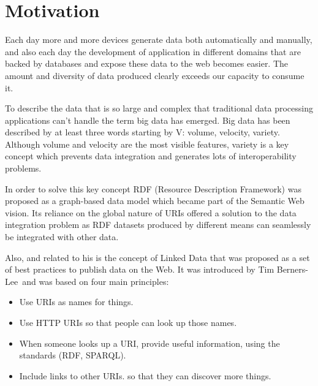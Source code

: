 \section{Motivation}

Each day more and more devices generate data both automatically and manually, and also each day the development of application in different domains that are backed by databases and expose these data to the web becomes easier. The amount and diversity of data produced clearly exceeds our capacity to consume it.

To describe the data that is so large and complex that traditional data processing applications can’t handle the term big data  has emerged. Big data has been described by at least three words starting by V: volume, velocity, variety. Although volume and velocity are the most visible features, variety is a key concept which prevents data integration and generates lots of interoperability problems.

In order to solve this key concept RDF (Resource Description Framework) was proposed as a graph-based data model  which became part of the Semantic Web  vision. Its reliance on the global nature of URIs offered a solution to the data integration problem as RDF datasets produced by different means can seamlessly be integrated with other data.

Also, and related to his is the concept of Linked Data  that was proposed as a set of best practices to publish data on the Web. It was introduced by Tim Berners-Lee and was based on four main principles:

\begin{itemize}
  \item Use URIs as names for things.
  \item Use HTTP URIs so that people can look up those names.
  \item When someone looks up a URI, provide useful information, using the standards (RDF, SPARQL).
  \item Include links to other URIs. so that they can discover more things.
\end{itemize}

